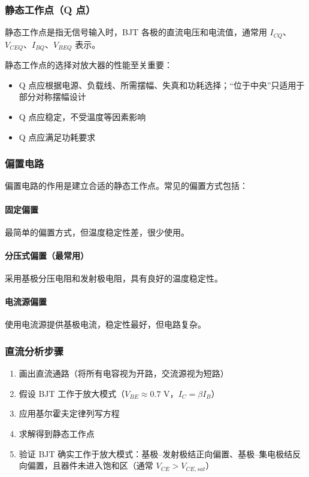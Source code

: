 \subsubsection{静态工作点（Q 点）}

静态工作点是指无信号输入时，BJT 各极的直流电压和电流值，通常用 $I_{CQ}$、$V_{CEQ}$、$I_{BQ}$、$V_{BEQ}$ 表示。

静态工作点的选择对放大器的性能至关重要：
\begin{itemize}
  \item Q 点应根据电源、负载线、所需摆幅、失真和功耗选择；“位于中央”只适用于部分对称摆幅设计
  \item Q 点应稳定，不受温度等因素影响
  \item Q 点应满足功耗要求
\end{itemize}

\subsubsection{偏置电路}

偏置电路的作用是建立合适的静态工作点。常见的偏置方式包括：

\paragraph{固定偏置}

最简单的偏置方式，但温度稳定性差，很少使用。

\paragraph{分压式偏置（最常用）}

采用基极分压电阻和发射极电阻，具有良好的温度稳定性。

\paragraph{电流源偏置}

使用电流源提供基极电流，稳定性最好，但电路复杂。

\subsubsection{直流分析步骤}

\begin{enumerate}
  \item 画出直流通路（将所有电容视为开路，交流源视为短路）
  \item 假设 BJT 工作于放大模式（$V_{BE} \approx 0.7$ V，$I_C = \beta I_B$）
  \item 应用基尔霍夫定律列写方程
  \item 求解得到静态工作点
  \item 验证 BJT 确实工作于放大模式：基极--发射极结正向偏置、基极--集电极结反向偏置，且器件未进入饱和区（通常 $V_{CE} > V_{CE,sat}$）
\end{enumerate}

